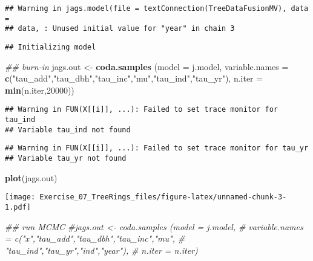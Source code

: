 \documentclass[]{article}
\newenvironment{Shaded}{\begin{snugshade}}{\end{snugshade}}
\newcommand{\CommentTok}[1]{\textcolor[rgb]{0.56,0.35,0.01}{\textit{#1}}}
\newcommand{\DataTypeTok}[1]{\textcolor[rgb]{0.13,0.29,0.53}{#1}}
\newcommand{\DecValTok}[1]{\textcolor[rgb]{0.00,0.00,0.81}{#1}}
\newcommand{\KeywordTok}[1]{\textcolor[rgb]{0.13,0.29,0.53}{\textbf{#1}}}
\newcommand{\NormalTok}[1]{#1}
\newcommand{\StringTok}[1]{\textcolor[rgb]{0.31,0.60,0.02}{#1}}
\begin{document}
\begin{verbatim}
## Warning in jags.model(file = textConnection(TreeDataFusionMV), data =
## data, : Unused initial value for "year" in chain 3
\end{verbatim}

\begin{verbatim}
## Initializing model
\end{verbatim}

\begin{Shaded}
\begin{Highlighting}[]
  \CommentTok{## burn-in}
\NormalTok{  jags.out   <-}\StringTok{ }\KeywordTok{coda.samples}\NormalTok{ (}\DataTypeTok{model =}\NormalTok{ j.model,}
                              \DataTypeTok{variable.names =} \KeywordTok{c}\NormalTok{(}\StringTok{"tau_add"}\NormalTok{,}\StringTok{"tau_dbh"}\NormalTok{,}\StringTok{"tau_inc"}\NormalTok{,}\StringTok{"mu"}\NormalTok{,}\StringTok{"tau_ind"}\NormalTok{,}\StringTok{"tau_yr"}\NormalTok{),}
                              \DataTypeTok{n.iter =} \KeywordTok{min}\NormalTok{(n.iter,}\DecValTok{20000}\NormalTok{))}
\end{Highlighting}
\end{Shaded}

\begin{verbatim}
## Warning in FUN(X[[i]], ...): Failed to set trace monitor for tau_ind
## Variable tau_ind not found
\end{verbatim}

\begin{verbatim}
## Warning in FUN(X[[i]], ...): Failed to set trace monitor for tau_yr
## Variable tau_yr not found
\end{verbatim}

\begin{Shaded}
\begin{Highlighting}[]
  \KeywordTok{plot}\NormalTok{(jags.out)}
\end{Highlighting}
\end{Shaded}

\texttt{[image: Exercise\_07\_TreeRings\_files/figure-latex/unnamed-chunk-3-1.pdf]}

\begin{Shaded}
\begin{Highlighting}[]
  \CommentTok{## run MCMC}
  \CommentTok{#jags.out   <- coda.samples (model = j.model,}
  \CommentTok{#                            variable.names = c("x","tau_add","tau_dbh","tau_inc","mu",}
  \CommentTok{#                                               "tau_ind","tau_yr","ind","year"),}
  \CommentTok{#                            n.iter = n.iter)}
\end{Highlighting}
\end{Shaded}
\end{document}
